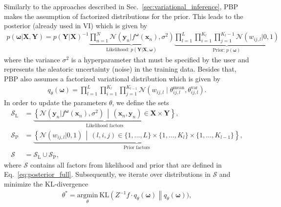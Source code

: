 \documentclass[runningheads]{llncs}
\begin{document}
Similarly to the approaches described in Sec.~\ref{sec:variational_inference}, PBP makes the assumption of factorized distributions for the prior.
This leads to the posterior (already used in VI) which is given by
\begin{align}
    p(\boldsymbol{\omega} | \mathbf{X}, \mathbf{Y}) =
    p(\mathbf{Y} |\mathbf{X})^{-1}
    \underbrace{\prod_{n=1}^{N} \mathcal{N}\left( \mathbf{y}_n | f^{\boldsymbol{\omega}}\left( \mathbf{x}_n \right), \sigma^2 \right)}_{\text{Likelihood: } p(\mathbf{Y} | \mathbf{X}, \boldsymbol{\omega})}
    \underbrace{ \prod_{l=1}^{L} \prod_{i=1}^{K_l} \prod_{j=1}^{K_l-1}\mathcal{N}\left( w_{ij,l} | 0, 1\right)}_{\text{Prior: }p(\boldsymbol{\omega})} \label{eq:posterior_full}
\end{align}
where the variance $\sigma^2$ is a hyperparameter that must be specified by the user and represents the aleatoric uncertainty (noise) in the training data.
Besides that, PBP also assumes a factorized variational distribution which is given by
\begin{align}
    q_\theta\left(\boldsymbol{\omega}\right) = \prod_{l=1}^{L}\prod_{i=1}^{K_l}\prod_{j=1}^{K_{l-1}} \mathcal{N}\left( w_{ij,l} \mid \theta^\mathrm{mean}_{ij,l}, \theta^\mathrm{var}_{ij,l}\right)\label{eq:variational_factorized_bpb}.
\end{align}
In order to update the parameters $\theta$, we define the sets
\begin{align}
    \mathcal{S}_{\mathrm{L}} &= \underbrace{\left\{ \mathcal{N}\left( \mathbf{y}_n | f^{\boldsymbol{\omega}}\left( \mathbf{x}_n \right), \sigma^2 \right) \,\middle|\, (\mathbf{x}_n, \mathbf{y}_n) \in \mathbf{X} \times \mathbf{Y}\right\}}_{\text{Likelihood factors}},\\
    \mathcal{S}_{\mathrm{P}} &= \underbrace{\left\{ \mathcal{N}\left( w_{ij,l}|0, 1\right) \,\middle|\,(l, i, j) \in \{1, \dots, L\}\times \{1, \dots, K_l\}\times \{1, \dots, K_{l-1}\}  \right\}}_{\text{Prior factors}},\\
    \mathcal{S} &= \mathcal{S}_{\mathrm{L}} \cup \mathcal{S}_{\mathrm{P}},
\end{align}
where $\mathcal{S}$ contains all factors from likelihood and prior that are defined in Eq.~\ref{eq:posterior_full}.
Subsequently, we iterate over distributions in $\mathcal{S}$ and minimize the KL-divergence
\begin{align}
    \theta^* = \underset{\theta}{\mathrm{argmin}}\  \mathrm{KL}\left(Z^{-1}f\cdot q_\theta(\boldsymbol{\omega})\right \| q_\theta(\boldsymbol{\omega})),
\end{align}
\end{document}
